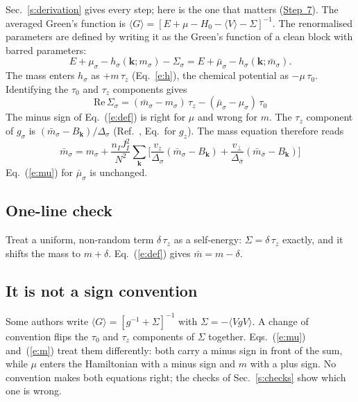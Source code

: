 \documentclass[11pt,a4paper]{article}
\begin{document}
Sec.~\ref{s:derivation} gives every step; here is the one that matters (\hyperref[st:identify]{Step~7}).
The averaged Green's function is
$\langle G\rangle = [E+\mu-H_0-\langle V\rangle-\Sigma]^{-1}$. The renormalised parameters
are defined by writing it as the Green's function of a clean block with barred parameters:
\begin{equation}
E+\mu_\sigma-h_\sigma(\bm k; m_\sigma)-\Sigma_\sigma = E+\bar\mu_\sigma - h_\sigma(\bm k;\bar m_\sigma).
\end{equation}
The mass enters $h_\sigma$ as $+m\,\tau_z$ (Eq.~\ref{e:h}), the chemical potential as $-\mu\,\tau_0$.
Identifying the $\tau_0$ and $\tau_z$ components gives
\begin{equation}
\boxed{\;\mathrm{Re}\,\Sigma_\sigma = (\bar m_\sigma-m_\sigma)\,\tau_z-(\bar\mu_\sigma-\mu_\sigma)\,\tau_0\;}
\label{e:defok}
\end{equation}
The minus sign of Eq.~(\ref{e:def}) is right for $\mu$ and wrong for $m$. The $\tau_z$ component of
$g_\sigma$ is $(\bar m_\sigma-B_{\bm k})/\Delta_\sigma$ (Ref.~\cite{g2g1}, Eq.~for $g_z$). The mass equation
therefore reads
\begin{equation}
\boxed{\;\bar m_\sigma = m_\sigma + \frac{n_I J_I^2}{N^2}\sum_{\bm k}\Big[\frac{v_z}{\Delta_\sigma}(\bar m_\sigma-B_{\bm k})
 + \frac{v_\perp}{\Delta_{\bar\sigma}}(\bar m_{\bar\sigma}-B_{\bm k})\Big]\;}
\label{e:mok}
\end{equation}
Eq.~(\ref{e:mu}) for $\bar\mu_\sigma$ is unchanged.

\subsection{One-line check}

Treat a uniform, non-random term $\delta\,\tau_z$ as a self-energy: $\Sigma=\delta\,\tau_z$ exactly, and
it shifts the mass to $m+\delta$. Eq.~(\ref{e:def}) gives $\bar m = m-\delta$.

\subsection{It is not a sign convention}

Some authors write $\langle G\rangle=[g^{-1}+\Sigma]^{-1}$ with $\Sigma=-\langle VgV\rangle$. A change of convention
flips the $\tau_0$ and $\tau_z$ components of $\Sigma$ together. Eqs.~(\ref{e:mu}) and~(\ref{e:m}) treat them
differently: both carry a minus sign in front of the sum, while $\mu$ enters the Hamiltonian
with a minus sign and $m$ with a plus sign. No convention makes both equations right; the
checks of Sec.~\ref{s:checks} show which one is wrong.
\end{document}
